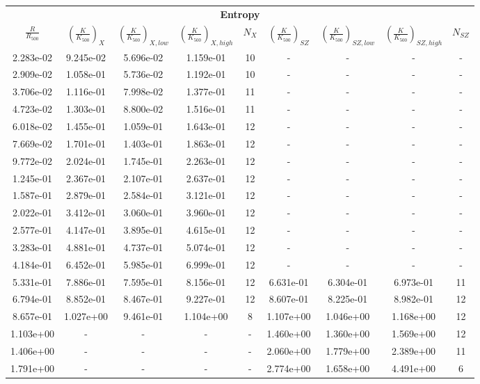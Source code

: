 \documentclass[traditabstract   ]{aa} %
\begin{document}
\begin{appendix}
\begin{table}
\begin{center}


\begin{tabular}{ c c c c c c c c c }
\multicolumn{9}{c}{\bf Entropy} \\
$\frac{R}{R_{500}}$ & $\left( \frac{K}{K_{500}} \right)_{X}$ & $\left( \frac{K}{K_{500}} \right)_{X,low}$ & $\left( \frac{K}{K_{500}} \right)_{X,high}$ & $N_{X}$ & $\left( \frac{K}{K_{500}} \right)_{SZ}$ & $\left( \frac{K}{K_{500}} \right)_{SZ,low}$ & $\left( \frac{K}{K_{500}} \right)_{SZ,high}$ & $N_{SZ}$ \\
\hline
2.283e-02 & 9.245e-02 & 5.696e-02 & 1.159e-01 & 10 & - & - & - & - \\
2.909e-02 & 1.058e-01 & 5.736e-02 & 1.192e-01 & 10 & - & - & - & - \\
3.706e-02 & 1.116e-01 & 7.998e-02 & 1.377e-01 & 11 & - & - & - & - \\
4.723e-02 & 1.303e-01 & 8.800e-02 & 1.516e-01 & 11 & - & - & - & - \\
6.018e-02 & 1.455e-01 & 1.059e-01 & 1.643e-01 & 12 & - & - & - & - \\
7.669e-02 & 1.701e-01 & 1.403e-01 & 1.863e-01 & 12 & - & - & - & - \\
9.772e-02 & 2.024e-01 & 1.745e-01 & 2.263e-01 & 12 & - & - & - & - \\
1.245e-01 & 2.367e-01 & 2.107e-01 & 2.637e-01 & 12 & - & - & - & - \\
1.587e-01 & 2.879e-01 & 2.584e-01 & 3.121e-01 & 12 & - & - & - & - \\
2.022e-01 & 3.412e-01 & 3.060e-01 & 3.960e-01 & 12 & - & - & - & - \\
2.577e-01 & 4.147e-01 & 3.895e-01 & 4.615e-01 & 12 & - & - & - & - \\
3.283e-01 & 4.881e-01 & 4.737e-01 & 5.074e-01 & 12 & - & - & - & - \\
4.184e-01 & 6.452e-01 & 5.985e-01 & 6.999e-01 & 12 & - & - & - & - \\
5.331e-01 & 7.886e-01 & 7.595e-01 & 8.156e-01 & 12 & 6.631e-01 & 6.304e-01 & 6.973e-01 & 11 \\
6.794e-01 & 8.852e-01 & 8.467e-01 & 9.227e-01 & 12 & 8.607e-01 & 8.225e-01 & 8.982e-01 & 12 \\
8.657e-01 & 1.027e+00 & 9.461e-01 & 1.104e+00 & 8 & 1.107e+00 & 1.046e+00 & 1.168e+00 & 12 \\
1.103e+00 & - & - & - & - & 1.460e+00 & 1.360e+00 & 1.569e+00 & 12 \\
1.406e+00 & - & - & - & - & 2.060e+00 & 1.779e+00 & 2.389e+00 & 11 \\
1.791e+00 & - & - & - & - & 2.774e+00 & 1.658e+00 & 4.491e+00 & 6 \\
\hline
\end{tabular}



\end{center}
\end{table}
\end{appendix}
\end{document}
